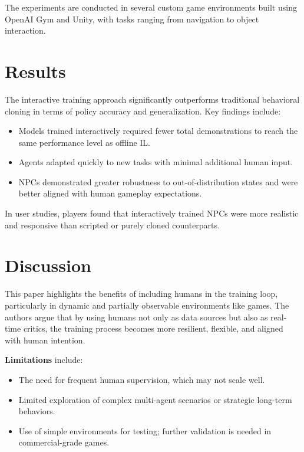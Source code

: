 \documentclass[12pt,a4paper]{article}
\begin{document}
The experiments are conducted in several custom game environments built using OpenAI Gym and Unity, with tasks ranging from navigation to object interaction.

\section*{Results}

The interactive training approach significantly outperforms traditional behavioral cloning in terms of policy accuracy and generalization. Key findings include:

\begin{itemize}
  \item Models trained interactively required fewer total demonstrations to reach the same performance level as offline IL.
  \item Agents adapted quickly to new tasks with minimal additional human input.
  \item NPCs demonstrated greater robustness to out-of-distribution states and were better aligned with human gameplay expectations.
\end{itemize}

In user studies, players found that interactively trained NPCs were more realistic and responsive than scripted or purely cloned counterparts.

\section*{Discussion}

This paper highlights the benefits of including humans in the training loop, particularly in dynamic and partially observable environments like games. The authors argue that by using humans not only as data sources but also as real-time critics, the training process becomes more resilient, flexible, and aligned with human intention.

\textbf{Limitations} include:

\begin{itemize}
  \item The need for frequent human supervision, which may not scale well.
  \item Limited exploration of complex multi-agent scenarios or strategic long-term behaviors.
  \item Use of simple environments for testing; further validation is needed in commercial-grade games.
\end{itemize}
\end{document}
